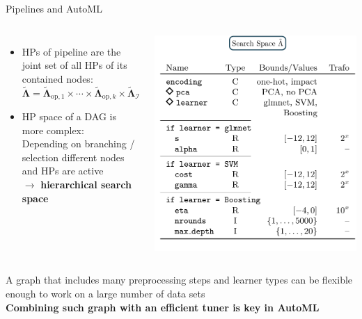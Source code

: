 \documentclass[11pt,compress,t,notes=noshow, xcolor=table]{beamer}
\begin{document}
\begin{vbframe}{Pipelines and AutoML}
\begin{columns}
\begin{itemize}
    \item HPs of pipeline are the joint set of all HPs of its contained nodes:\\
    $\tilde{\bm\Lambda}=\tilde{\bm\Lambda}_{\mathrm{op}, 1} \times \cdots \times \tilde{\bm\Lambda}_{\mathrm{op}, k} \times \tilde{\bm\Lambda}_{\mathcal{I}}$
    \item HP space of a DAG is more complex:\\
    Depending on branching / selection different nodes and HPs are active\\ $\rightarrow$ \textbf{hierarchical search space}
\end{itemize}
\begin{center}
\includegraphics[width = \textwidth]{figure_man/pipeline_with_param_table_II.png}
\end{center}
\end{columns}%
\vspace{1em}

A graph that includes many preprocessing steps and learner types can be flexible enough to work on a large number of data sets\\
\vspace{1em}
\textbf{Combining such graph with an efficient tuner is key in AutoML}
\end{vbframe}
\end{document}
